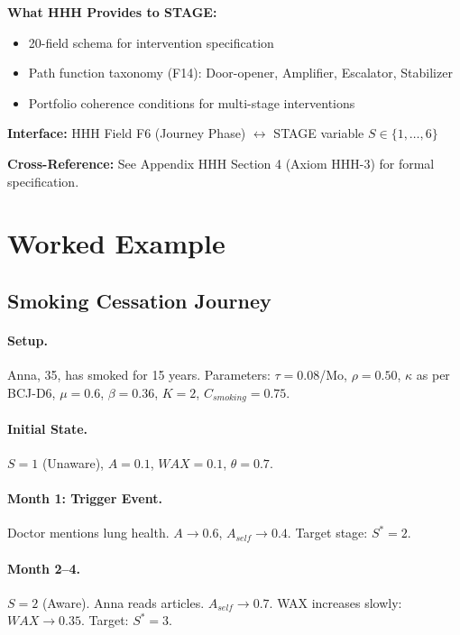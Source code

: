 \begin{tcolorbox}[colback=orange!5!white, colframe=orange!75!black,
    title=\textbf{Integration: STAGE $\leftrightarrow$ HHH (Intervention Toolkit)}]
\textbf{What HHH Provides to STAGE:}
\begin{itemize}[nosep]
\item 20-field schema for intervention specification
\item Path function taxonomy (F14): Door-opener, Amplifier, Escalator, Stabilizer
\item Portfolio coherence conditions for multi-stage interventions
\end{itemize}

\textbf{Interface:} HHH Field F6 (Journey Phase) $\leftrightarrow$ STAGE variable $S \in \{1, \ldots, 6\}$

\textbf{Cross-Reference:} See Appendix HHH Section 4 (Axiom HHH-3) for formal specification.

\end{tcolorbox}



\section{Worked Example}
\label{sec:bcj-example}

\subsection{Smoking Cessation Journey}

\paragraph{Setup.} Anna, 35, has smoked for 15 years. Parameters: $\tau=0.08$/Mo, $\rho=0.50$, $\kappa$ as per BCJ-D6, $\mu=0.6$, $\beta=0.36$, $K=2$, $C_{smoking}=0.75$.

\paragraph{Initial State.} $S=1$ (Unaware), $A=0.1$, $WAX=0.1$, $\theta=0.7$.

\paragraph{Month 1: Trigger Event.} Doctor mentions lung health. $A \to 0.6$, $A_{self} \to 0.4$. Target stage: $S^*=2$.

\paragraph{Month 2--4.} $S=2$ (Aware). Anna reads articles. $A_{self} \to 0.7$. WAX increases slowly: $WAX \to 0.35$. Target: $S^*=3$.

